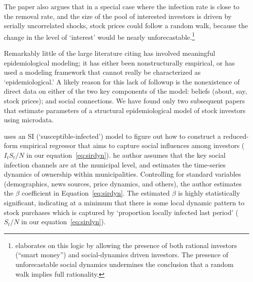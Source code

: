 The paper also argues that in a special case where the infection rate is close to the removal rate, and the size of the pool of interested investors is driven by serially uncorrelated shocks, stock prices could follow a random walk, because the change in the level of `interest' would be nearly unforecastable.\footnote{\cite{shiller1984stock} elaborates on this logic by allowing the presence of both rational investors (``smart money'') and social-dynamics driven investors. The presence of unforecastable social dynamics undermines the conclusion that a random walk implies full rationality.} %

Remarkably little of the large literature citing \cite{shiller1989survey} has involved meaningful epidemiological modeling; it has either been nonstructurally empirical, or has used a modeling framework that cannot really be characterized as `epidemiological.'
A likely reason for this lack of followup is the nonexistence of direct data on either of the two key components of the model: beliefs (about, say, stock prices); and social connections.  
We have found only two subsequent papers that estimate parameters of a structural epidemiological model of stock investors using microdata.

\href{https://github.com/iworld1991/EpiExp/blob/master/Literature/shive2010epidemic.pdf}{\cite{shive2010epidemic}} uses an SI (`susceptible-infected') model to figure out how to construct a reduced-form empirical regressor that aims to capture social influences among investors ($I_tS_t/N$ in our equation~\eqref{eq:sirdyn}). he author assumes that the key social infection channels are at the municipal level, and estimates the time-series dynamics of ownership within municipalities.  Controlling for standard variables (demographics, news sources, price dynamics, and others), the author estimates the $\beta$ coefficient in Equation~\eqref{eq:sirdyn}.  The estimated $\beta$ is highly statistically significant, indicating at a minimum that there is some local dynamic pattern to stock purchases which is captured by `proportion locally infected last period' ($S_t/N$ in our equation~\eqref{eq:sirdyn}).

